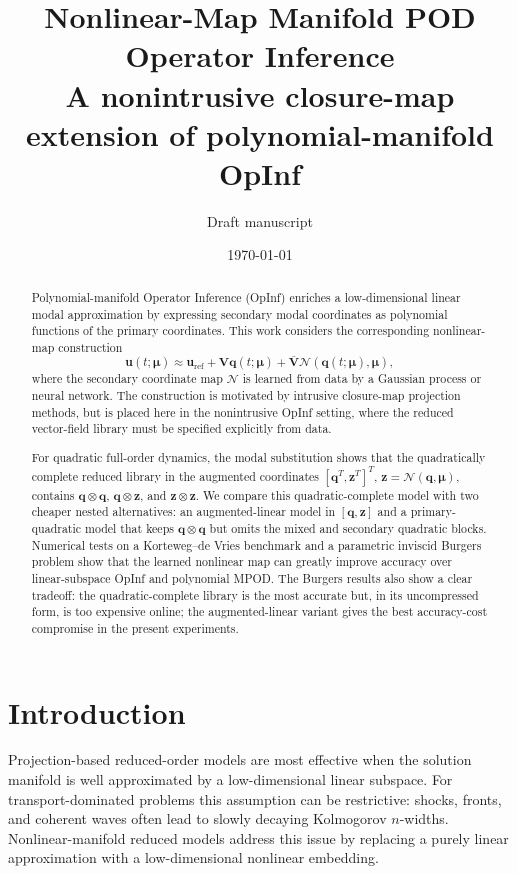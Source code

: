\documentclass[11pt]{article}
\title{\textbf{Nonlinear-Map Manifold POD Operator Inference}\\
\large A nonintrusive closure-map extension of polynomial-manifold OpInf}
\author{Draft manuscript}
\date{\today}
\newcommand{\bu}{\mathbf u}
\newcommand{\bq}{\boldsymbol q}
\newcommand{\bz}{\boldsymbol z}
\newcommand{\bmu}{\boldsymbol\mu}
\newcommand{\bV}{\mathbf V}
\newcommand{\bVbar}{\bar{\mathbf V}}
\newcommand{\uref}{\mathbf u_{\mathrm{ref}}}
\newcommand{\Nmap}{\mathcal{N}}
\begin{document}
\maketitle

\begin{abstract}
Polynomial-manifold Operator Inference (OpInf) enriches a low-dimensional
linear modal approximation by expressing secondary modal coordinates as
polynomial functions of the primary coordinates.  This work considers the
corresponding nonlinear-map construction
\[
  \bu(t;\bmu)\approx \uref+\bV\bq(t;\bmu)
  +\bVbar\Nmap(\bq(t;\bmu),\bmu),
\]
where the secondary coordinate map $\Nmap$ is learned from data by a Gaussian
process or neural network.  The construction is motivated by intrusive
closure-map projection methods, but is placed here in the nonintrusive OpInf
setting, where the reduced vector-field library must be specified explicitly
from data.

For quadratic full-order dynamics, the modal substitution shows that the
quadratically complete reduced library in the augmented coordinates
$[\bq^T,\bz^T]^T$, $\bz=\Nmap(\bq,\bmu)$, contains
$\bq\otimes\bq$, $\bq\otimes\bz$, and $\bz\otimes\bz$.  We compare this
quadratic-complete model with two cheaper nested alternatives: an
augmented-linear model in $[\bq,\bz]$ and a primary-quadratic model that keeps
$\bq\otimes\bq$ but omits the mixed and secondary quadratic blocks.  Numerical
tests on a Korteweg--de Vries benchmark and a parametric inviscid Burgers
problem show that the learned nonlinear map can greatly improve accuracy over
linear-subspace OpInf and polynomial MPOD.  The Burgers results also show a
clear tradeoff: the quadratic-complete library is the most accurate but, in its
uncompressed form, is too expensive online; the augmented-linear variant gives
the best accuracy-cost compromise in the present experiments.
\end{abstract}

\section{Introduction}

Projection-based reduced-order models are most effective when the solution
manifold is well approximated by a low-dimensional linear subspace.  For
transport-dominated problems this assumption can be restrictive: shocks,
fronts, and coherent waves often lead to slowly decaying Kolmogorov
$n$-widths.  Nonlinear-manifold reduced models address this issue by replacing
a purely linear approximation with a low-dimensional nonlinear embedding.
\end{document}
